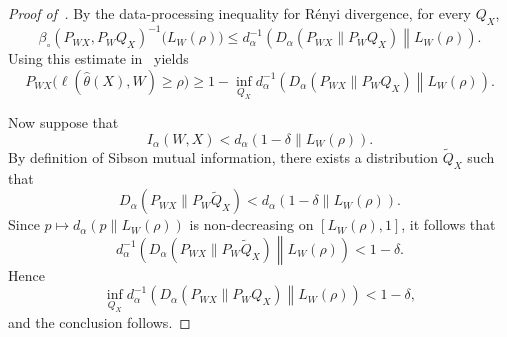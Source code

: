\documentclass[11pt]{article}
\theoremstyle{definition}
\theoremstyle{remark}
\newcommand{\1}{\boldsymbol{1}}
\begin{document}
\begin{proof}[Proof of~]
By the data-processing inequality for R\'enyi divergence, for every $Q_X$,
\begin{equation}
\beta_{\circ}(P_{WX},P_WQ_X)^{-1}\bigl(L_W(\rho)\bigr)
\leq
d_\alpha^{-1}
\left(
D_\alpha(P_{WX}\|P_WQ_X)
\middle\|
L_W(\rho)
\right).
\end{equation}
Using this estimate in~ yields
\begin{equation}
P_{WX}\bigl(\ell(\widehat\theta(X),W)\geq\rho\bigr)
\geq
1-
\inf_{Q_X}
d_\alpha^{-1}
\left(
D_\alpha(P_{WX}\|P_WQ_X)
\middle\|
L_W(\rho)
\right).
\end{equation}

Now suppose that
\[
I_\alpha(W,X)
<
d_\alpha
\left(
1-\delta
\middle\|
L_W(\rho)
\right).
\]
By definition of Sibson mutual information, there exists a distribution
$\widetilde Q_X$ such that
\[
D_\alpha(P_{WX}\|P_W\widetilde Q_X)
<
d_\alpha
\left(
1-\delta
\middle\|
L_W(\rho)
\right).
\]
Since $p\mapsto d_\alpha(p\|L_W(\rho))$ is non-decreasing on
$[L_W(\rho),1]$, it follows that
\[
d_\alpha^{-1}
\left(
D_\alpha(P_{WX}\|P_W\widetilde Q_X)
\middle\|
L_W(\rho)
\right)
<
1-\delta.
\]
Hence
\[
\inf_{Q_X}
d_\alpha^{-1}
\left(
D_\alpha(P_{WX}\|P_WQ_X)
\middle\|
L_W(\rho)
\right)
<
1-\delta,
\]
and the conclusion follows.
\end{proof}
\end{document}

